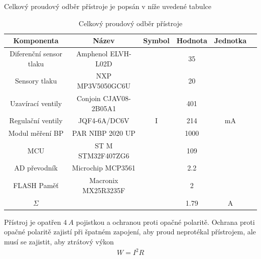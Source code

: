 Celkový proudový odběr přístroje je popsán v níže uvedené tabulce
\begin{table}[H]
    \label{tab:sum_of_current}
    \caption{Celkový proudový odběr přístroje}
    \centering
    \begin{ctucolortab}
        \begin{tabular}{cccccc}
            \toprule
            Komponenta              & Název                 & Symbol & Hodnota & Jednotka \\ \midrule
            Diferenční sensor tlaku & Amphenol ELVH-L02D    &        & 35      &          \\
            Sensory tlaku           & NXP MP3V5050GC6U      &        & 20      &          \\
            Uzavírací ventily       & Conjoin CJAV08-2B05A1 &        & 401     &          \\
            Regulační ventily       & JQF4-6A/DC6V          & I      & 214     & mA       \\
            Modul měření BP         & PAR NIBP 2020 UP      &        & 1000    &          \\
            MCU                     & ST M STM32F407ZG6     &        & 109     &          \\
            AD převodník            & Microchip MCP3561     &        & 2.2     &          \\
            FLASH Paměť             & Macronix MX25R3235F   &        & 2       &          \\
            \bottomrule
            $\Sigma$                &                       &        & 1.79    & A        \\
            \bottomrule
        \end{tabular}
    \end{ctucolortab}
\end{table}

Přístroj je opatřen $4 \ A$ pojistkou a ochranou proti opačné polaritě.
Ochrana proti opačné polaritě zajistí při špatném zapojení, aby proud neprotékal přístrojem, ale musí se zajistit, aby ztrátový výkon
\begin{align*}
    W = I^2 R
\end{align*}

